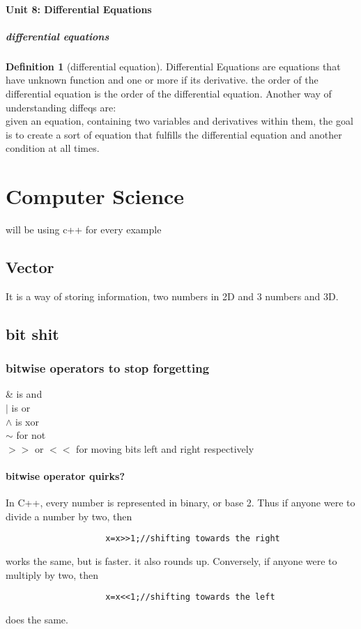 \documentclass{article} %
\theoremstyle{theorem}
\theoremstyle{definition}
\newtheorem{definition}{Definition}[paragraph]
\begin{document}
            \paragraph{Unit 8: Differential Equations}
            \label{par:Unit-8}
                \subparagraph{differential equations}
                \label{subp:differential-e}
                    \begin{definition}[differential equation]
                        Differential Equations are equations that have unknown function and one or more if its derivative. the order of the differential equation is the order of the differential equation.
                        Another way of understanding diffeqs are:\\given an equation, containing two variables and derivatives within them, the goal is to create a sort of equation that fulfills the differential equation and another condition at all times.
                    \end{definition}
\pagebreak
\section{Computer Science}\label{sec:csSec}
will be using c++ for every example
    \subsection{Vector}\label{sub:csVec}
    It is a way of storing information, two numbers in 2D and 3 numbers and 3D.
    \subsection{bit shit}
        \subsubsection{bitwise operators to stop forgetting}
            \begin{center}
                \& is and\\$|$ is or\\$\wedge$ is xor\\$\sim$ for not\\$>>$ or $<<$ for moving bits left and right respectively
            \end{center}
            \paragraph{bitwise operator quirks?}
                In C++, every number is represented in binary, or base 2. Thus if anyone were to divide a number by two, then
                \begin{verbatim}
                    x=x>>1;//shifting towards the right
                \end{verbatim}
                works the same, but is faster. it also rounds up. Conversely, if anyone were to multiply by two, then 
                \begin{verbatim}
                    x=x<<1;//shifting towards the left
                \end{verbatim}
                does the same.
\end{document}
